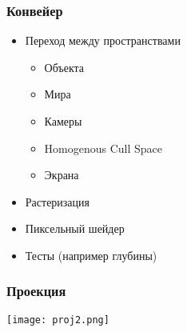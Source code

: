 \documentclass{beamer}
\begin{document}
\begin{frame}
\frametitle{Конвейер}
\begin{itemize}
\item Переход между пространствами
\begin{itemize}
    \item Объекта
    \item Мира
    \item Камеры
    \item Homogenous Cull Space
    \item Экрана
\end{itemize}
\pause
\item Растеризация
\pause
\item Пиксельный шейдер
\pause
\item Тесты (например глубины)
\end{itemize}
\end{frame}
\begin{frame}
\frametitle{Проекция}
    \begin{center}
    \texttt{[image: proj2.png]}
    \end{center}
\end{frame}
\end{document}

